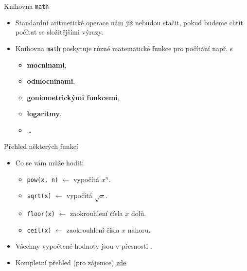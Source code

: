 \documentclass[14pt,aspectratio=169]{beamer}
\begin{document}
    \begin{frame}[t]{Knihovna \texttt{math}}
        \begin{itemize}
            \item Standardní aritmetické operace nám již nebudou stačit, pokud budeme chtít počítat se složitějšími výrazy.
            \item Knihovna \texttt{math} poskytuje různé matematické funkce pro počítání např. s
            \begin{itemize}
                \item \textbf{mocninami},
                \item \textbf{odmocninami},
                \item \textbf{goniometrickými funkcemi},
                \item \textbf{logaritmy},
                \item \dots
            \end{itemize}
        \end{itemize}
    \end{frame}

    \begin{frame}[t]{Přehled některých funkcí}
        \begin{itemize}
            \item Co se vám může hodit:
            \begin{itemize}
                \item \texttt{pow(x, n)} $\leftarrow$ vypočítá $x^n$.
                \item \texttt{sqrt(x)} $\leftarrow$ vypočítá $\sqrt{x}$.
                \item \texttt{floor(x)} $\leftarrow$ zaokrouhlení čísla $x$ dolů.
                \item \texttt{ceil(x)} $\leftarrow$ zaokrouhlení čísla $x$ nahoru.
            \end{itemize}
            \item Všechny vypočtené hodnoty jsou v přesnosti .
            \item Kompletní přehled (pro zájemce) \href{https://www.tutorialspoint.com/c_standard_library/math_h.htm}{\underline{zde}}
        \end{itemize}
    \end{frame}
\end{document}
